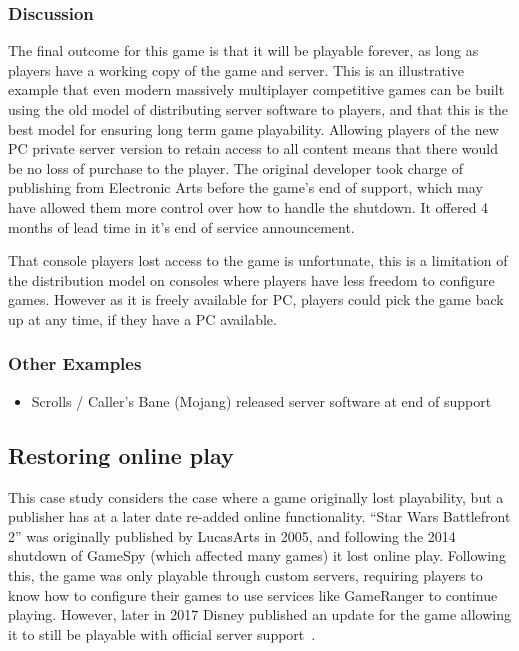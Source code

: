 \subsubsection*{Discussion}
The final outcome for this game is that it will be playable forever, as long as players have a working copy of the game and server.
This is an illustrative example that even modern massively multiplayer competitive games can be built using the old model of distributing server software to players,
and that this is the best model for ensuring long term game playability.
Allowing players of the new PC private server version to retain access to all content means that there would be no loss of purchase to the player.
The original developer took charge of publishing from Electronic Arts before the game's end of support, which may have allowed them more control over how to handle the shutdown.
It offered 4 months of lead time in it's end of service announcement.

That console players lost access to the game is unfortunate, this is a limitation of the distribution model on consoles where players have less freedom to configure games.
However as it is freely available for PC, players could pick the game back up at any time, if they have a PC available.

\subsubsection*{Other Examples}
\begin{itemize}
    \item Scrolls / Caller's Bane (Mojang) released server software at end of support\cite{scrolls-server-2018}
\end{itemize}

\subsection{Restoring online play}
This case study considers the case where a game originally lost playability, but a publisher has at a later date re-added online functionality.
``Star Wars Battlefront 2'' was originally published by LucasArts in 2005,
and following the 2014 shutdown of GameSpy (which affected many games) it lost online play.
Following this, the game was only playable through custom servers,
requiring players to know how to configure their games to use services like GameRanger to continue playing.
However, later in 2017 Disney published an update for the game allowing it to still be playable with official server support~\cite{disney-swbf2-2017}.

